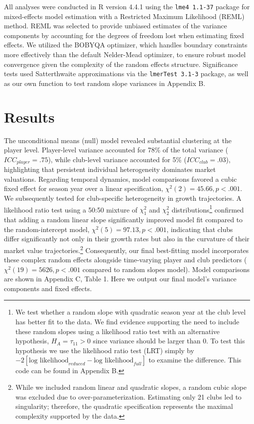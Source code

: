 \documentclass[
  12pt,
]{article}
\begin{document}
All analyses were conducted in R version 4.4.1 using the
\texttt{lme4\ 1.1-37} package for mixed-effects model estimation with a
Restricted Maximum Likelihood (REML) method. REML was selected to
provide unbiased estimates of the variance components by accounting for
the degrees of freedom lost when estimating fixed effects. We utilized
the BOBYQA optimizer, which handles boundary constraints more
effectively than the default Nelder-Mead optimizer, to ensure robust
model convergence given the complexity of the random effects structure.
Significance tests used Satterthwaite approximations via the
\texttt{lmerTest\ 3.1-3} package, as well as our own function to test
random slope variances in Appendix B.

\section{Results}\label{results}

The unconditional means (null) model revealed substantial clustering at
the player level. Player-level variance accounted for 78\% of the total
variance (\(ICC_{player}=.75\)), while club-level variance accounted for
5\% (\(ICC_{club}=.03\)), highlighting that persistent individual
heterogeneity dominates market valuations. Regarding temporal dynamics,
model comparisons favored a cubic fixed effect for season year over a
linear specification, \(\chi^2(2)=45.66, p<.001\). We subsequently
tested for club-specific heterogeneity in growth trajectories. A
likelihood ratio test using a 50:50 mixture of \(\chi^2_1\) and
\(\chi^2_2\) distributions\footnote{We test whether a random slope with
  quadratic season year at the club level has better fit to the data. We
  find evidence supporting the need to include these random slopes using
  a likelihood ratio test with an alternative hypothesis,
  \(H_A=\tau_{11} > 0\) since variance should be larger than 0. To test
  this hypothesis we use the likelihood ratio test (LRT) simply by
  \(-2[\text{log likelihood}_{reduced} - \text{log likelihood}_{full}]\)
  to examine the difference. This code can be found in Appendix B.}
confirmed that adding a random linear slope significantly improved model
fit compared to the random-intercept model, \(\chi^2(5)=97.13, p<.001\),
indicating that clubs differ significantly not only in their growth
rates but also in the curvature of their market value
trajectories.\footnote{While we included random linear and quadratic
  slopes, a random cubic slope was excluded due to
  over-parameterization. Estimating only 21 clubs led to singularity;
  therefore, the quadratic specification represents the maximal
  complexity supported by the data.} Consequently, our final
best-fitting model incorporates these complex random effects alongside
time-varying player and club predictors (\(\chi^2(19)=5626, p<.001\)
compared to random slopes model). Model comparisons are shown in
Appendix C, Table 1. Here we output our final model's variance
components and fixed effects.
\end{document}
